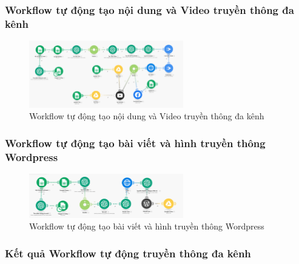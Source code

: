 \subsubsection{Workflow tự động tạo nội dung và Video truyền thông đa kênh}

\begin{figure}[h!]
    \centering
    \includegraphics[width=0.6\textwidth]{img/Picture11.png}
    \caption{Workflow tự động tạo nội dung và Video truyền thông đa kênh}
    \label{fig:workflow-video}
\end{figure}

\subsubsection{Workflow tự động tạo bài viết và hình truyền thông Wordpress}

\begin{figure}[h!]
    \centering
    \includegraphics[width=0.6\textwidth]{img/Picture12.png}
    \caption{Workflow tự động tạo bài viết và hình truyền thông Wordpress}
    \label{fig:workflow-wordpress}
\end{figure}

\subsubsection{Kết quả Workflow tự động truyền thông đa kênh}

